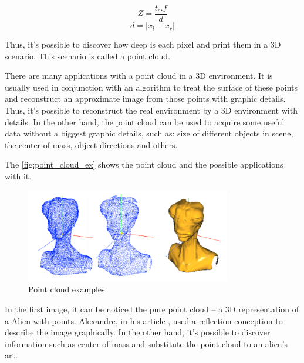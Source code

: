     \begin{equation}\label{eq:profundidade}
    Z = \frac{t_{c}.f}{d}
    \end{equation}
    \begin{equation}\label{eq:disparidade}
    d = |x_{l}-x_{r}|
    \end{equation}

    Thus, it's possible to discover how deep is each pixel and print them in a 3D scenario. This scenario is called a point cloud.

    There are many applications with a point cloud in a 3D environment. It is usually used in conjunction with an algorithm to treat the surface of these points and reconstruct an approximate image from those points with graphic details. Thus, it's possible to reconstruct the real environment by a 3D environment with details. In the other hand, the point cloud can be used to acquire some useful data without a biggest graphic details, such as: size of different objects in scene, the center of mass, object directions and others.

    The \autoref{fig:point_cloud_ex} shows the point cloud and the possible applications with it. 
    
    \begin{figure}[H]
     \caption{\label{fig:point_cloud_ex}
Point cloud examples}
     \begin{center}
        \includegraphics[width=0.8\textwidth]{images/imagem_point_cloud.png}
     \end{center}
    \end{figure}

In the first image, it can be noticed the pure point cloud – a 3D representation of a Alien with points. Alexandre, in his article \cite{pointCloud_ex}, used a reflection conception to describe the image graphically. In the other hand, it’s possible to discover information such as center of mass and substitute the point cloud to an alien's art.

